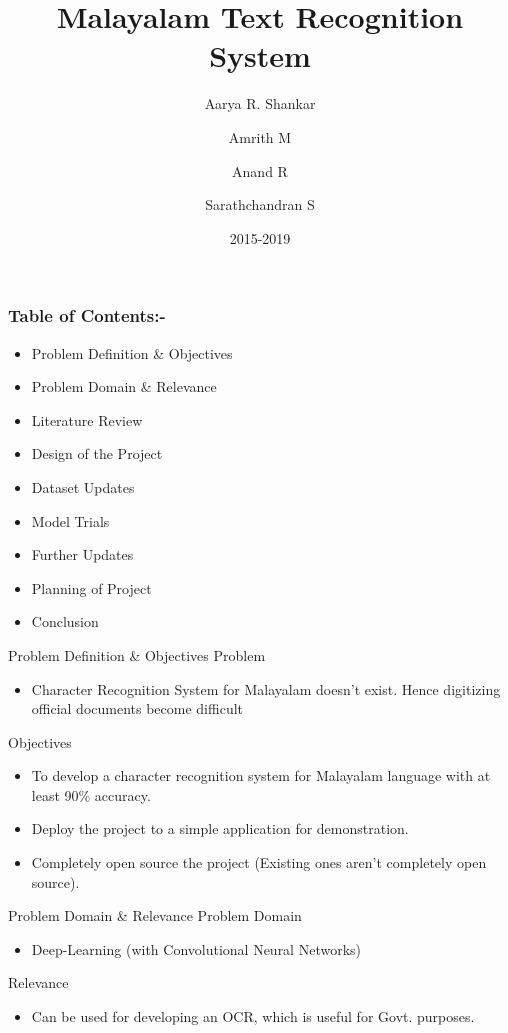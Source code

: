 \documentclass{beamer}
\title{Malayalam Text Recognition System}
\author{Aarya R. Shankar
			\and Amrith M
				 \and Anand R
					\and Sarathchandran S}
\institute{Department of Computer Science\and College of Engineering,Trivandrum}
\date{2015-2019}
\begin{document}
\frame{\titlepage}


\begin{frame}
\frametitle{Table of Contents:-}
\begin{itemize}
\item Problem Definition \& Objectives
\item Problem Domain \& Relevance
\item Literature Review
\item Design of the Project
\item Dataset Updates
\item Model Trials
\item Further Updates
\item Planning of Project
\item Conclusion



\end{itemize}

\end{frame}

\begin{frame}{Problem Definition \& Objectives}
    Problem
    \begin{itemize}
         \item
         Character Recognition System for Malayalam doesn't exist. Hence digitizing official documents become difficult
    \end{itemize}
    Objectives
    \begin{itemize}
        \item To develop a character recognition system for Malayalam language with at least 90\% accuracy.
        \item Deploy the project to a simple application for demonstration.
        \item Completely open source the project (Existing ones aren't completely open source).
    \end{itemize}
     
\end{frame}

\begin{frame}{Problem Domain \& Relevance}
    Problem Domain
    \begin{itemize}
         \item
         Deep-Learning (with Convolutional Neural Networks) 
    \end{itemize}
    Relevance
    \begin{itemize}
        \item Can be used for developing an OCR, which is useful for Govt. purposes.
    
    \end{itemize}
     
\end{frame}
\end{document}
